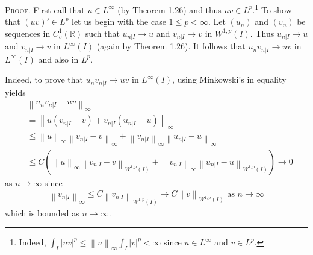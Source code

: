 \documentclass[a4paper,oneside]{article}
\numberwithin{equation}{section}
\begin{document}
\textsc{Proof.} First call that $u\in L^{\infty}$ (by Theorem 1.26) and thus $uv\in L^p$.\footnote{Indeed, $\int_I {{{\left| {uv} \right|}^p}}  \le {\left\| u \right\|_\infty }\int_I {{{\left| v \right|}^p}}  < \infty $ since $u\in L^{\infty}$ and $v\in L^p$.} To show that $\left(uv\right)'\in L^p$ let us begin with the case $1\le p<\infty$. Let $\left(u_n\right)$ and $\left(v_n\right)$ be sequences in $C_c^1\left(\mathbb{R}\right)$ such that ${u_{\left. n \right|I}} \to u$ and ${v_{\left. n \right|I}} \to v$ in $W^{1,p}\left(I\right)$. Thus ${u_{\left. n \right|I}} \to u$ and ${v_{\left. n \right|I}} \to v$ in $L^{\infty}\left(I\right)$ (again by Theorem 1.26). It follows that ${u_n}{v_{\left. n \right|I}} \to uv$ in $L^{\infty}\left(I\right)$ and also in $L^p$. 

Indeed, to prove that ${u_n}{v_{\left. n \right|I}} \to uv$ in $L^{\infty}\left(I\right)$, using Minkowski's in equality yields
\begin{align}
&{\left\| {{u_n}{v_{\left. n \right|I}} - uv} \right\|_\infty } \\
&= {\left\| {u\left( {{v_{\left. n \right|I}} - v} \right) + {v_{\left. n \right|I}}\left( {{u_{\left. n \right|I}} - u} \right)} \right\|_\infty }\\
 &\le {\left\| u \right\|_\infty }{\left\| {{v_{\left. n \right|I}} - v} \right\|_\infty } + {\left\| {{v_{\left. n \right|I}}} \right\|_\infty }{\left\| {{u_{\left. n \right|I}} - u} \right\|_\infty }\\
 &\le C\left( {{{\left\| u \right\|}_\infty }{{\left\| {{v_{\left. n \right|I}} - v} \right\|}_{{W^{1,p}}\left( I \right)}} + {{\left\| {{v_{\left. n \right|I}}} \right\|}_\infty }{{\left\| {{u_{\left. n \right|I}} - u} \right\|}_{{W^{1,p}}\left( I \right)}}} \right) \to 0
\end{align}
as $n \to \infty $ since 
\begin{align}
\label{1.345}
{\left\| {{v_{\left. n \right|I}}} \right\|_\infty } \le C{\left\| {{v_{\left. n \right|I}}} \right\|_{{W^{1,p}}\left( I \right)}} \to C{\left\| v \right\|_{{W^{1,p}}\left( I \right)}}\mbox{ as } n \to \infty 
\end{align}
which is bounded as $n \to \infty $. 
\end{document}
